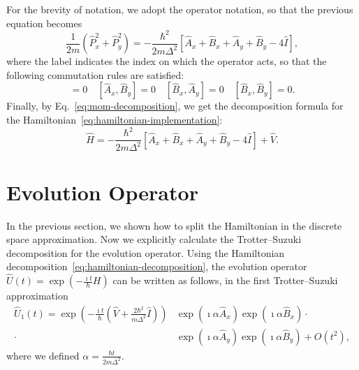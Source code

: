 For the brevity of notation, we adopt the operator notation, so that the previous equation becomes
\begin{equation} \label{eq:mom-decomposition}
\frac{1}{2m} \left( \hat{P}_x^2 + \hat{P}_y^2 \right)= -\frac{\hbar^2}{2m\Delta^2} \left[ \hat{A}_x + \hat{B}_x + \hat{A}_y + \hat{B}_y - 4 \hat{I} \right],
\end{equation}
where the label indicates the index on which the operator acts, so that the following commutation rules are satisfied:
\begin{equation}
[\hat{A}_x, \hat{A}_y] = 0 \quad [\hat{A}_x, \hat{B}_y] = 0 \quad [\hat{B}_x, \hat{A}_y] = 0 \quad [\hat{B}_x, \hat{B}_y] = 0.
\end{equation} 
Finally, by Eq.~\eqref{eq:mom-decomposition}, we get the decomposition formula for the Hamiltonian~\eqref{eq:hamiltonian-implementation}:
\begin{equation} \label{eq:hamiltonian-decomposition}
\hat{H} = -\frac{\hbar^2}{2 m \Delta^2} \left[ \hat{A}_x + \hat{B}_x + \hat{A}_y + \hat{B}_y - 4 \hat{I} \right] + \hat{V}.
\end{equation}

\section{Evolution Operator}
In the previous section, we shown how to split the Hamiltonian in the discrete space approximation. Now we explicitly calculate the Trotter--Suzuki decomposition for the evolution operator. Using the Hamiltonian decomposition~\eqref{eq:hamiltonian-decomposition}, the evolution operator $\hat{U}(t) = \exp(-\frac{\imath t}{\hbar} H)$ can be written as follows, in the first Trotter--Suzuki approximation
\begin{align} \label{eq:1approxTS}
\hat{U}_1(t) = \exp\left(-\frac{\imath t}{\hbar}\left(\hat{V} + \frac{2 \hbar^2}{m \Delta^2} \hat{I}\right) \right) & \exp\left(\imath \alpha \hat{A}_x \right) \exp\left(\imath \alpha \hat{B}_x \right) \cdot \\ \cdot & \exp\left(\imath \alpha \hat{A}_y \right) \exp\left(\imath \alpha \hat{B}_y \right) + O(t^2), \nonumber
\end{align}
where we defined $\alpha = \frac{\hbar t}{2m\Delta^2}$. 

